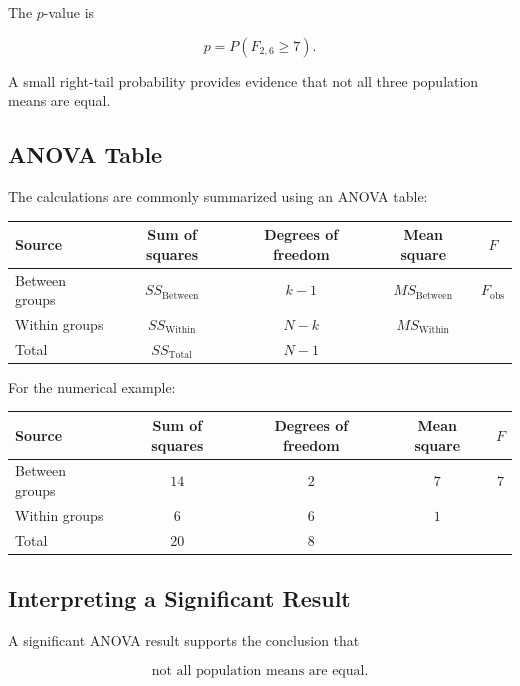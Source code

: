 \documentclass[11pt]{article}
\begin{document}
The \(p\)-value is

\[
p=P(F_{2,6}\geq7).
\]

A small right-tail probability provides evidence that not all three
population means are equal.

\subsection{ANOVA Table}

The calculations are commonly summarized using an ANOVA table:

\begin{center}
\begin{tabular}{lcccc}
\toprule
Source
& Sum of squares
& Degrees of freedom
& Mean square
& \(F\) \\
\midrule
Between groups
& \(SS_{\mathrm{Between}}\)
& \(k-1\)
& \(MS_{\mathrm{Between}}\)
& \(F_{\mathrm{obs}}\) \\

Within groups
& \(SS_{\mathrm{Within}}\)
& \(N-k\)
& \(MS_{\mathrm{Within}}\)
& \\

Total
& \(SS_{\mathrm{Total}}\)
& \(N-1\)
&
& \\
\bottomrule
\end{tabular}
\end{center}

For the numerical example:

\begin{center}
\begin{tabular}{lcccc}
\toprule
Source
& Sum of squares
& Degrees of freedom
& Mean square
& \(F\) \\
\midrule
Between groups & \(14\) & \(2\) & \(7\) & \(7\) \\
Within groups  & \(6\)  & \(6\) & \(1\) & \\
Total          & \(20\) & \(8\) & & \\
\bottomrule
\end{tabular}
\end{center}

\subsection{Interpreting a Significant Result}

A significant ANOVA result supports the conclusion that

\[
\text{not all population means are equal}.
\]
\end{document}
